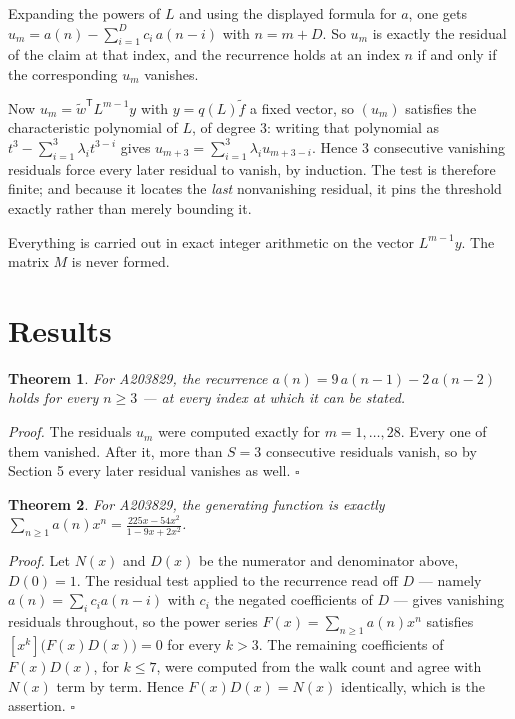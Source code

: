 \documentclass[11pt]{article}
\newtheorem{theorem}{Theorem}
\theoremstyle{definition}
\begin{document}
Expanding the powers of $L$ and using the displayed formula for $a$, one gets $u_m = a(n) - \sum_{i=1}^{D} c_i\,a(n-i)$ with $n = m + D$. So $u_m$ is exactly the residual of the claim at that index, and the recurrence holds at an index $n$ if and only if the corresponding $u_m$ vanishes.

Now $u_m = \tilde w^{\mathsf T} L^{m-1} y$ with $y = q(L)\tilde f$ a fixed vector, so $(u_m)$ satisfies the characteristic polynomial of $L$, of degree $3$: writing that polynomial as $t^{3} - \sum_{i=1}^{3} \lambda_i t^{3-i}$ gives $u_{m+3} = \sum_{i=1}^{3} \lambda_i u_{m+3-i}$. Hence $3$ consecutive vanishing residuals force every later residual to vanish, by induction. The test is therefore finite; and because it locates the {\itshape last} nonvanishing residual, it pins the threshold exactly rather than merely bounding it.

Everything is carried out in exact integer arithmetic on the vector $L^{m-1}y$. The matrix $M$ is never formed.

\section{Results}

\begin{theorem} For A203829, the recurrence $a(n) = 9\,a(n-1) - 2\,a(n-2)$ holds for every $n \ge 3$ --- at every index at which it can be stated.\end{theorem}

{\itshape Proof.} The residuals $u_m$ were computed exactly for $m = 1,\dots,28$. Every one of them vanished. After it, more than $S = 3$ consecutive residuals vanish, so by Section 5 every later residual vanishes as well. $\square$

\begin{theorem} For A203829, the generating function is exactly $\sum_{n\ge 1} a(n)x^n = \frac{225x - 54x^{2}}{1 - 9x + 2x^{2}}$.\end{theorem}

{\itshape Proof.} Let $N(x)$ and $D(x)$ be the numerator and denominator above, $D(0)=1$. The residual test applied to the recurrence read off $D$ --- namely $a(n) = \sum_i c_i a(n-i)$ with $c_i$ the negated coefficients of $D$ --- gives vanishing residuals throughout, so the power series $F(x)=\sum_{n\ge 1}a(n)x^n$ satisfies $[x^k]\bigl(F(x)D(x)\bigr) = 0$ for every $k > 3$. The remaining coefficients of $F(x)D(x)$, for $k \le 7$, were computed from the walk count and agree with $N(x)$ term by term. Hence $F(x)D(x) = N(x)$ identically, which is the assertion. $\square$
\end{document}
